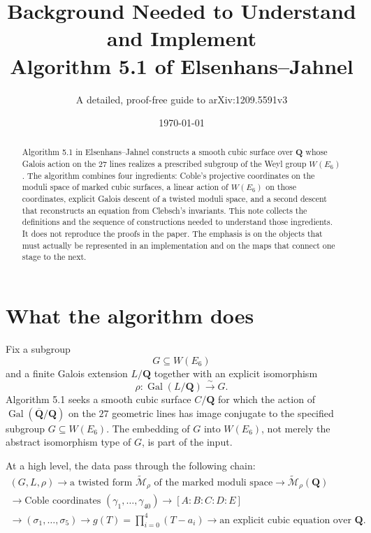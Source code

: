 \documentclass[11pt]{article}
\title{Background Needed to Understand and Implement\\
Algorithm 5.1 of Elsenhans--Jahnel}
\author{A detailed, proof-free guide to arXiv:1209.5591v3}
\date{\today}
\newcommand{\QQ}{\mathbf{Q}}
\newcommand{\ol}[1]{\overline{#1}}
\newcommand{\Gal}{\operatorname{Gal}}
\newcommand{\tcM}{\widetilde{\mathcal{M}}}
\begin{document}
\maketitle

\begin{abstract}
Algorithm 5.1 in Elsenhans--Jahnel constructs a smooth cubic surface over
$\QQ$ whose Galois action on the $27$ lines realizes a prescribed subgroup
of the Weyl group $W(E_6)$.  The algorithm combines four ingredients:
Coble's projective coordinates on the moduli space of marked cubic surfaces,
a linear action of $W(E_6)$ on those coordinates, explicit Galois descent of
a twisted moduli space, and a second descent that reconstructs an equation
from Clebsch's invariants.  This note collects the definitions and the
sequence of constructions needed to understand those ingredients.  It does
not reproduce the proofs in the paper.  The emphasis is on the objects that
must actually be represented in an implementation and on the maps that
connect one stage to the next.
\end{abstract}

\tableofcontents

\section{What the algorithm does}

Fix a subgroup
\[
  G\subseteq W(E_6)
\]
and a finite Galois extension $L/\QQ$ together with an explicit isomorphism
\[
  \rho:\Gal(L/\QQ)\xrightarrow{\sim}G.
\]
Algorithm 5.1 seeks a smooth cubic surface $C/\QQ$ for which the action of
$\Gal(\ol\QQ/\QQ)$ on the $27$ geometric lines has image conjugate to the
specified subgroup $G\subseteq W(E_6)$.  The embedding of $G$ into $W(E_6)$,
not merely the abstract isomorphism type of $G$, is part of the input.

At a high level, the data pass through the following chain:
\[
\begin{gathered}
 (G,L,\rho)
 \longrightarrow
 \text{a twisted form }\tcM_{\rho}\text{ of the marked moduli space}
 \longrightarrow
 \tcM_{\rho}(\QQ) \\
 \longrightarrow
 \text{Coble coordinates }(\gamma_1,\ldots,\gamma_{40})
 \longrightarrow
 [A:B:C:D:E] \\
 \longrightarrow
 (\sigma_1,\ldots,\sigma_5)
 \longrightarrow
 g(T)=\prod_{i=0}^{4}(T-a_i)
 \longrightarrow
 \text{an explicit cubic equation over }\QQ.
\end{gathered}
\]
\end{document}
